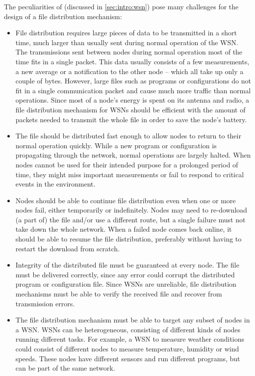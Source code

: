 The peculiarities of  (discussed in \ref{sec:intro:wsn}) pose many challenges for the design of a file distribution mechanism:
\begin{itemize}
\item File distribution requires large pieces of data to be transmitted in a short time, much larger than usually sent during normal operation of the \gls{WSN}. The transmissions sent between nodes during normal operation most of the time fits in a single packet. This data usually consists of a few measurements, a new average or a notification to the other node -- which all take up only a couple of bytes. However, large files such as programs or configurations do not fit in a single communication packet and cause much more traffic than normal operations. Since most of a node's energy is spent on its antenna and radio, a file distribution mechanism for \glspl{WSN} should be efficient with the amount of packets needed to transmit the whole file in order to save the node's battery.
\item The file should be distributed fast enough to allow nodes to return to their normal operation quickly. While a new program or configuration is propagating through the network, normal operations are largely halted. When nodes cannot be used for their intended purpose for a prolonged period of time, they might miss important measurements or fail to respond to critical events in the environment.
\item Nodes should be able to continue file distribution even when one or more nodes fail, either temporarily or indefinitely. Nodes may need to re-download (a part of) the file and/or use a different route, but a single failure must not take down the whole network. When a failed node comes back online, it should be able to resume the file distribution, preferably without having to restart the download from scratch.
\item Integrity of the distributed file must be guaranteed at every node. The file must be delivered correctly, since any error could corrupt the distributed program or configuration file. Since \glspl{WSN} are unreliable, file distribution mechanisms must be able to verify the received file and recover from transmission errors.
\item The file distribution mechanism must be able to target any subset of nodes in a \gls{WSN}. \glspl{WSN} can be heterogeneous, consisting of different kinds of nodes running different tasks. For example, a \gls{WSN} to measure weather conditions could consist of different nodes to measure temperature, humidity or wind speeds. These nodes have different sensors and run different programs, but can be part of the same network.
\end{itemize}

